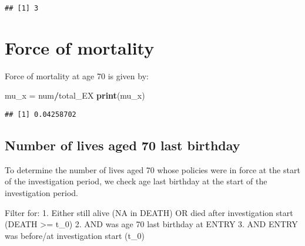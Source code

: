\documentclass[
]{article}
\newenvironment{Shaded}{\begin{snugshade}}{\end{snugshade}}
\newcommand{\CommentTok}[1]{\textcolor[rgb]{0.56,0.35,0.01}{\textit{#1}}}
\newcommand{\DecValTok}[1]{\textcolor[rgb]{0.00,0.00,0.81}{#1}}
\newcommand{\FunctionTok}[1]{\textcolor[rgb]{0.13,0.29,0.53}{\textbf{#1}}}
\newcommand{\NormalTok}[1]{#1}
\newcommand{\OtherTok}[1]{\textcolor[rgb]{0.56,0.35,0.01}{#1}}
\newcommand{\SpecialCharTok}[1]{\textcolor[rgb]{0.81,0.36,0.00}{\textbf{#1}}}
\begin{document}
\begin{Shaded}
\end{Shaded}

\begin{verbatim}
## [1] 3
\end{verbatim}

\section{Force of mortality}\label{force-of-mortality}

Force of mortality at age 70 is given by:

\begin{Shaded}
\begin{Highlighting}[]
\NormalTok{mu\_x }\OtherTok{=}\NormalTok{ num}\SpecialCharTok{/}\NormalTok{total\_EX}
\FunctionTok{print}\NormalTok{(mu\_x)}
\end{Highlighting}
\end{Shaded}

\begin{verbatim}
## [1] 0.04258702
\end{verbatim}

\subsection{Number of lives aged 70 last
birthday}\label{number-of-lives-aged-70-last-birthday}

To determine the number of lives aged 70 whose policies were in force at
the start of the investigation period, we check age last birthday at the
start of the investigation period.

Filter for: 1. Either still alive (NA in DEATH) OR died after
investigation start (DEATH \textgreater= t\_0) 2. AND was age 70 last
birthday at ENTRY 3. AND ENTRY was before/at investigation start (t\_0)
\end{document}
